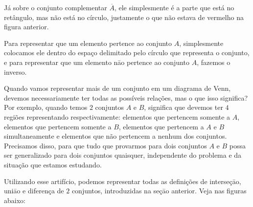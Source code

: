   Já sobre o conjunto complementar $\overline A$, ele simplesmente é a parte que está no retângulo, mas não está no círculo, justamente o que não estava de vermelho na figura anterior.


  Para representar que um elemento pertence ao conjunto $A$, simplesmente colocamos ele dentro do espaço delimitado pelo círculo que representa o conjunto, e para representar que um elemento nāo pertence ao conjunto $A$, fazemos o inverso.



  Quando vamos representar mais de um conjunto em um diagrama de Venn, devemos necessariamente ter todas as possíveis relações, mas o que isso significa? Por exemplo, quando temos $2$ conjuntos $A$ e $B$, significa que devemos ter $4$ regiões representando respectivamente: elementos que pertencem somente a $A$, elementos que pertencem somente a $B$, elementos que pertencem a $A$ e $B$ simultaneamente e elementos que não pertencem a nenhum dos conjuntos. Precisamos disso, para que tudo que provarmos para dois conjuntos $A$ e $B$ possa ser generalizado para dois conjuntos quaisquer, independente do problema e da situação que estamos estudando.

  Utilizando esse artifício, podemos representar todas as definições de interseçāo, uniāo e diferença de $2$ conjuntos, introduzidas na seçāo anterior. Veja nas figuras abaixo:



